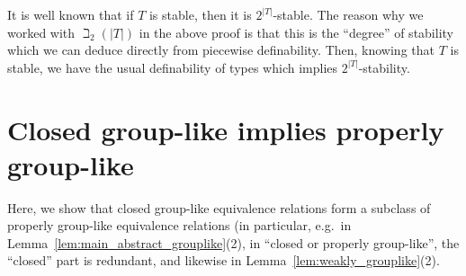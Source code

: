 	It is well known that if $T$ is stable, then it is $2^{|T|}$-stable. The reason why we worked with $\beth_2(|T|)$ in the above proof is that this is the ``degree'' of stability which we can deduce directly from piecewise definability. Then, knowing that $T$ is stable, we have the usual definability of types which implies $2^{|T|}$-stability.
	
	
	
	
	\section{Closed group-like implies properly group-like}
	Here, we show that closed group-like equivalence relations form a subclass of properly group-like equivalence relations (in particular, e.g.\ in Lemma~\ref{lem:main_abstract_grouplike}(2), in ``closed or properly group-like'', the ``closed'' part is redundant, and likewise in Lemma~\ref{lem:weakly_grouplike}(2).
	
